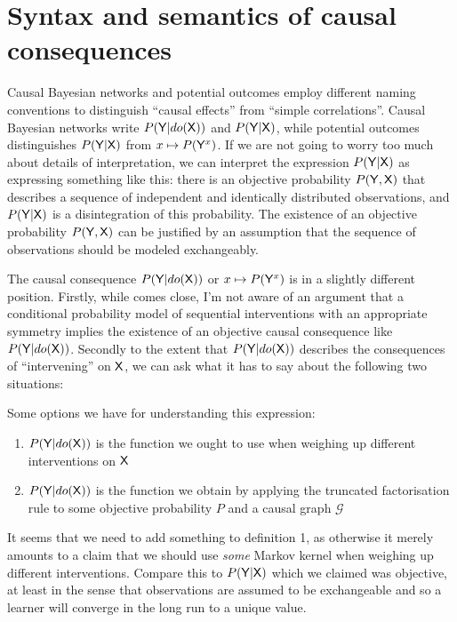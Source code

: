 


\section{Syntax and semantics of causal consequences}

Causal Bayesian networks and potential outcomes employ different naming conventions to distinguish ``causal effects'' from ``simple correlations''. Causal Bayesian networks write $P(\mathsf{Y}|do(\mathsf{X}))$ and $P(\mathsf{Y}|\mathsf{X})$, while potential outcomes distinguishes $P(\mathsf{Y}|\mathsf{X})$ from $x\mapsto P(\mathsf{Y}^x)$. If we are not going to worry too much about details of interpretation, we can interpret the expression $P(\mathsf{Y}|\mathsf{X})$ as expressing something like this: there is an objective probability $P(\mathsf{Y},\mathsf{X})$ that describes a sequence of independent and identically distributed observations, and $P(\mathsf{Y}|\mathsf{X})$ is a disintegration of this probability. The existence of an objective probability $P(\mathsf{Y},\mathsf{X})$ can be justified by an assumption that the sequence of observations should be modeled exchangeably.

The causal consequence $P(\mathsf{Y}|do(\mathsf{X}))$ or $x\mapsto P(\mathsf{Y}^x)$ is in a slightly different position. Firstly, while \citet{dawid_decision-theoretic_2020} comes close, I'm not aware of an argument that a conditional probability model of sequential interventions with an appropriate symmetry implies the existence of an objective causal consequence like $P(\mathsf{Y}|do(\mathsf{X}))$. Secondly to the extent that $P(\mathsf{Y}|do(\mathsf{X}))$ describes the consequences of ``intervening'' on $\mathsf{X}$, we can ask what it has to say about the following two situations:



Some options we have for understanding this expression:
\begin{enumerate}
    \item $P(\mathsf{Y}|do(\mathsf{X}))$ is the function we ought to use when weighing up different interventions on $\mathsf{X}$
    \item $P(\mathsf{Y}|do(\mathsf{X}))$ is the function we obtain by applying the truncated factorisation rule to some objective probability $P$ and a causal graph $\mathcal{G}$
\end{enumerate}

It seems that we need to add something to definition 1, as otherwise it merely amounts to a claim that we should use \emph{some} Markov kernel when weighing up different interventions. Compare this to $P(\mathsf{Y}|\mathsf{X})$ which we claimed was objective, at least in the sense that observations are assumed to be exchangeable and so a learner will converge in the long run to a unique value.


